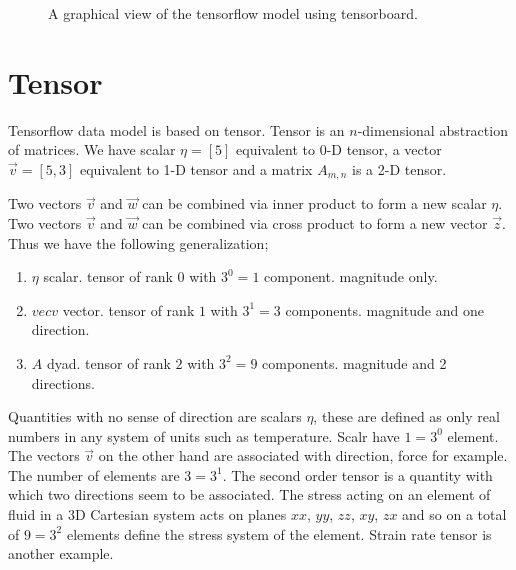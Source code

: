 \documentclass[vecarrow]{svproc}
\begin{document}
\begin{figure}
\caption{A graphical view of the tensorflow model using tensorboard.}
\label{fig:4}
\end{figure}

\section{Tensor}

Tensorflow data model is based on tensor. Tensor is an $n$-dimensional abstraction of matrices. We have
scalar $\eta=[5]$ equivalent to 0-D tensor, a vector $\vec{v}=[5, 3]$ equivalent to 1-D tensor and a matrix
$A_{m,n}$ is a 2-D tensor\cite{bowen2008introduction}\cite{kolecki2002introduction}.

Two vectors $\vec{v}$ and $\vec{w}$ can be combined via inner product to form a new scalar $\eta$. Two
vectors $\vec{v}$ and $\vec{w}$ can be combined via cross product to form a new vector $\vec{z}$. Thus we
have the following generalization;
\begin{enumerate}
\item $\eta$ scalar. tensor of rank $0$ with $3^0=1$ component. magnitude only.
\item $vec{v}$ vector. tensor of rank $1$ with $3^1=3$ components. magnitude and one direction.
\item $A$ dyad. tensor of rank $2$ with $3^2=9$ components. magnitude and 2 directions.
\end{enumerate}

Quantities with no sense of direction are scalars $\eta$, these are defined as only real numbers in any system of units such as temperature. Scalr have $1 = 3^0$ element. The vectors $\vec{v}$ on the other hand are associated with direction, force for example. The number of elements are $3 = 3^1$. The second order tensor is a quantity with which two directions seem to be associated. The stress acting on an element of fluid in a 3D Cartesian system acts on planes $xx$, $yy$, $zz$, $xy$, $zx$ and so on a total of $9 = 3^2$ elements define the stress system of the element. Strain rate tensor is another example.
\end{document}

